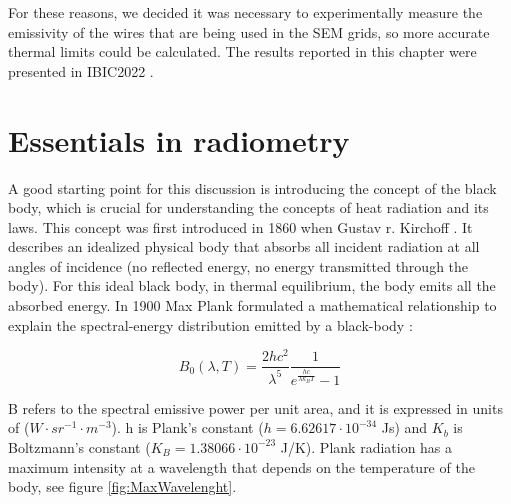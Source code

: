 For these reasons, we decided it was necessary to experimentally measure the emissivity of the wires that are being used in the SEM grids, so more accurate thermal limits could be calculated. The results reported in this chapter were presented in IBIC2022 \parencite*[]{ref:IBIC2022Araceli}.

\section{Essentials in radiometry}

A good starting point for this discussion is introducing the concept of the black body, which is crucial for understanding the concepts of heat radiation and its laws. This concept was first introduced in 1860 when Gustav r. Kirchoff \parencite[][]{ref:Kirchoff}. It describes an idealized physical body that absorbs all incident radiation at all angles of incidence (no reflected energy, no energy transmitted through the body). For this ideal black body, in thermal equilibrium, the body emits all the absorbed energy. In 1900 Max Plank formulated a mathematical relationship to explain the spectral-energy distribution emitted by a black-body \parencite[][]{ref:Planck}:

\begin{equation}
    B_{0}\left(\lambda,T\right) = \frac{2hc^2}{\lambda^5}\frac{1}{e^{\frac{hc}{\lambda k_B T}}-1}
    \label{eq:plank}
\end{equation}

B refers to the spectral emissive power per unit area, and it is expressed in units of ($W\cdot sr^{-1} \cdot m^{-3}$). h is Plank's constant ($h = 6.62617\cdot 10^{-34}$ Js) and $K_b$ is Boltzmann's constant ($K_{B} = 1.38066\cdot 10^{-23}$ J/K). Plank radiation has a maximum intensity at a wavelength that depends on the temperature of the body, see figure \ref{fig:MaxWavelenght}. 

